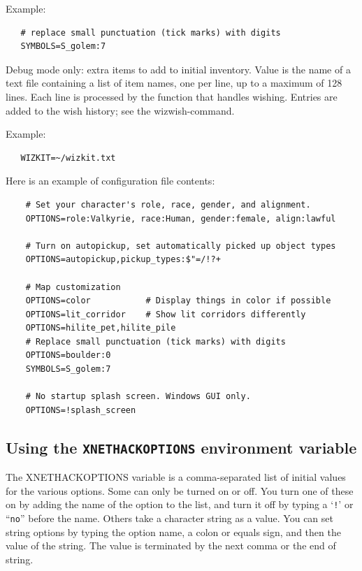 \documentclass[titlepage]{article}
\begin{document}
\begin{description}
Example:
\begin{verbatim}
   # replace small punctuation (tick marks) with digits
   SYMBOLS=S_golem:7
\end{verbatim}

\item[WIZKIT]
Debug mode only:  extra items to add to initial inventory.
Value is the name of a text file containing a list of item names,
one per line, up to a maximum of 128 lines.
Each line is processed by the function that handles wishing.
Entries are added to the wish history; see the wizwish-command.

Example:
\begin{verbatim}
   WIZKIT=~/wizkit.txt
\end{verbatim}
\end{description}

Here is an example of configuration file contents:
\begin{verbatim}
    # Set your character's role, race, gender, and alignment.
    OPTIONS=role:Valkyrie, race:Human, gender:female, align:lawful

    # Turn on autopickup, set automatically picked up object types
    OPTIONS=autopickup,pickup_types:$"=/!?+

    # Map customization
    OPTIONS=color           # Display things in color if possible
    OPTIONS=lit_corridor    # Show lit corridors differently
    OPTIONS=hilite_pet,hilite_pile
    # Replace small punctuation (tick marks) with digits
    OPTIONS=boulder:0
    SYMBOLS=S_golem:7

    # No startup splash screen. Windows GUI only.
    OPTIONS=!splash_screen
\end{verbatim}

\subsection*{Using the \texttt{XNETHACKOPTIONS} environment variable}

The XNETHACKOPTIONS variable is a comma-separated list of initial
values for the various options.  Some can only be turned on or off.
You turn one of these on by adding the name of the option to the list,
and turn it off by typing a `\texttt{!}' or ``\texttt{no}'' before the name.
Others take a
character string as a value.  You can set string options by typing
the option name, a colon or equals sign, and then the value of the string.
The value is terminated by the next comma or the end of string.
\end{document}
